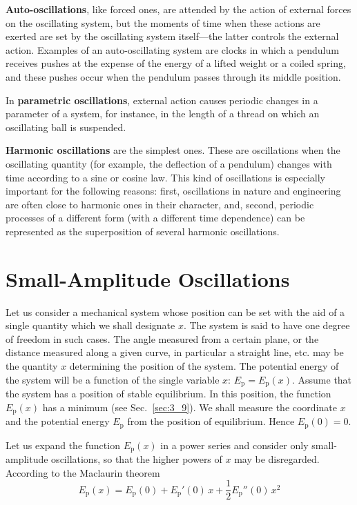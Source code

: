 \textbf{Auto-oscillations}, like forced ones, are attended by the action of external forces on the oscillating system, but the moments of time when these actions are exerted are set by the oscillating system itself---the latter controls the external action. Examples of an auto-oscillating system are clocks in which a pendulum receives pushes at the expense of the energy of a lifted weight or a coiled spring, and these pushes occur when the pendulum passes through its middle position.

In \textbf{parametric oscillations}, external action causes periodic changes in a parameter of a system, for instance, in the length of a thread on which an oscillating ball is suspended.

\textbf{Harmonic oscillations} are the simplest ones. These are oscillations when the oscillating quantity (for example, the deflection of a pendulum) changes with time according to a sine or cosine law. This kind of oscillations is especially important for the following reasons: first, oscillations in nature and engineering are often close to harmonic ones in their character, and, second, periodic processes of a different form (with a different time dependence) can be represented as the superposition of several harmonic oscillations.

\section{Small-Amplitude Oscillations}\label{sec:7_2}

Let us consider a mechanical system whose position can be set with the aid of a single quantity which we shall designate $x$. The system is said to have one degree of freedom in such cases. The angle measured from a certain plane, or the distance measured along a given curve, in particular a straight line, etc. may be the quantity $x$ determining the position of the system. The potential energy of the system will be a function of the single variable $x$: $E_{\text{p}}=E_{\text{p}}(x)$. Assume that the system has a position of stable equilibrium. In this position, the function $E_{\text{p}}(x)$ has a minimum (see Sec.~\ref{sec:3_9}). We shall measure the coordinate $x$ and the potential energy $E_{\text{p}}$ from the position of equilibrium. Hence $E_{\text{p}}(0)=0$.

Let us expand the function $E_{\text{p}}(x)$ in a power series and consider only small-amplitude oscillations, so that the higher powers of $x$ may be disregarded. According to the Maclaurin theorem
\begin{equation*}
	E_{\text{p}}(x) = E_{\text{p}}(0) + E_{\text{p}}'(0)\,x + \frac{1}{2}E_{\text{p}}''(0)\,x^2
\end{equation*}

